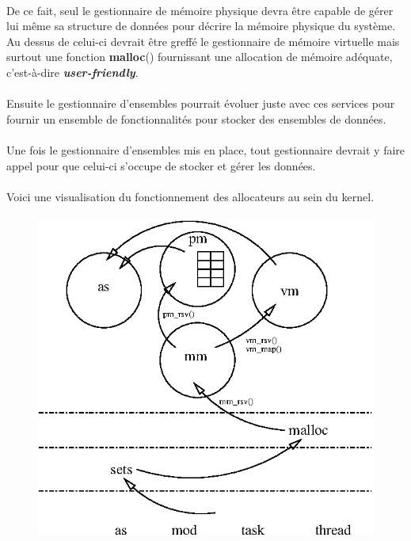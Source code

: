 \documentclass[10pt,a4wide]{article}
\begin{document}
\paragraph{}

De ce fait, seul le gestionnaire de m\'emoire physique devra \^etre capable
de g\'erer lui m\^eme sa structure de donn\'ees pour d\'ecrire la m\'emoire
physique du syst\`eme. Au dessus de celui-ci devrait \^etre greff\'e le
gestionnaire de m\'emoire virtuelle mais surtout une fonction
\textbf{malloc}() fournissant une allocation de m\'emoire ad\'equate,
c'est-\`a-dire \textit{\textbf{user-friendly}}.

\paragraph{}

Ensuite le gestionnaire d'ensembles pourrait \'evoluer juste avec ces
services pour fournir un ensemble de fonctionnalit\'es pour stocker
des ensembles de donn\'ees.

\paragraph{}

Une fois le gestionnaire d'ensembles mis en place, tout gestionnaire devrait
y faire appel pour que celui-ci s'occupe de stocker et g\'erer les
donn\'ees.

\paragraph{}

Voici une visualisation du fonctionnement des allocateurs au sein du
kernel.

\paragraph{}

\begin{figure}[h]
\centerline{\includegraphics{figures/sets.eps}}
\end{figure}
\end{document}
